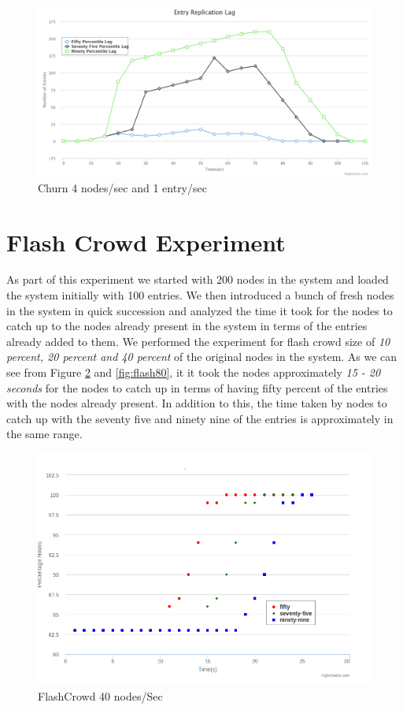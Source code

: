 \documentclass[a4paper,11pt]{kth-mag}
\begin{document}
\begin{figure}[h]
	\includegraphics[scale=0.20]{Churn200-4Node-1Entry}
	\caption{Churn 4 nodes/sec and 1 entry/sec}
	\label{fig:churn}
\end{figure}

\section{Flash Crowd Experiment}
As part of this experiment we started with 200 nodes in the system and loaded the system initially with 100 entries. We then introduced a bunch of fresh nodes in the system in quick succession and analyzed the time it took for the nodes to catch up to the nodes already present in the system in terms of the entries already added to them. We performed the experiment for flash crowd size of \textit{10 percent, 20 percent and 40 percent} of the original nodes in the system. As we can see from Figure \ref{fig:flash40} and \ref{fig:flash80}, it it took the nodes approximately \textit{ 15 - 20 seconds} for the nodes to catch up in terms of having fifty percent of the entries with the nodes already present. In addition to this, the time taken by nodes to catch up with the seventy five and ninety nine of the entries is approximately in the same range.

\begin{figure}[h]
	\includegraphics[scale=0.5]{200-40Nodes}
	\caption{FlashCrowd 40 nodes/Sec }
	\label{fig:flash40}
\end{figure}
\end{document}
